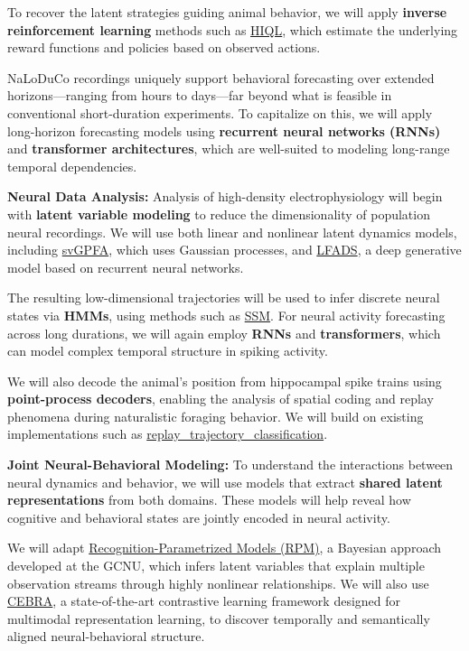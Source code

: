 To recover the latent strategies guiding animal behavior, we will apply
\textbf{inverse reinforcement learning} methods such as
\href{https://github.com/haozhu10015/hiql}{HIQL}, which estimate the underlying
reward functions and policies based on observed actions.

NaLoDuCo recordings uniquely support behavioral forecasting over extended
horizons—ranging from hours to days—far beyond what is feasible in conventional
short-duration experiments. To capitalize on this, we will apply
long-horizon forecasting models using \textbf{recurrent neural networks (RNNs)}
and \textbf{transformer architectures}, which are well-suited to modeling
long-range temporal dependencies.

\vspace{1em}
\noindent\textbf{Neural Data Analysis:}  
Analysis of high-density electrophysiology will begin with \textbf{latent
variable modeling} to reduce the dimensionality of population neural
recordings. We will use both linear and nonlinear latent dynamics models,
including \href{https://github.com/joacorapela/svGPFA}{svGPFA}, which uses
Gaussian processes, and \href{https://snel.ai/resources/lfads/}{LFADS}, a deep
generative model based on recurrent neural networks.

The resulting low-dimensional trajectories will be used to infer discrete
neural states via \textbf{HMMs}, using methods such as
\href{https://github.com/lindermanlab/ssm}{SSM}. For neural activity
forecasting across long durations, we will again employ \textbf{RNNs} and
\textbf{transformers}, which can model complex temporal structure in spiking
activity.

We will also decode the animal’s position from hippocampal spike trains using
\textbf{point-process decoders}, enabling the analysis of spatial coding and
replay phenomena during naturalistic foraging behavior. We will build on
existing implementations such as
\href{https://github.com/Eden-Kramer-Lab/replay_trajectory_classification}{replay\_trajectory\_classification}.

\vspace{1em}
\noindent\textbf{Joint Neural-Behavioral Modeling:}  
To understand the interactions between neural dynamics and behavior, we will
use models that extract \textbf{shared latent representations} from both
domains. These models will help reveal how cognitive and behavioral states are
jointly encoded in neural activity.

We will adapt
\href{https://github.com/gatsby-sahani/rpm-aistats-2023}{Recognition-Parametrized
Models (RPM)}, a Bayesian approach developed at the GCNU, which infers latent
variables that explain multiple observation streams through highly nonlinear
relationships. We will also use \href{https://cebra.ai/}{CEBRA}, a
state-of-the-art contrastive learning framework designed for multimodal
representation learning, to discover temporally and semantically aligned
neural-behavioral structure.

